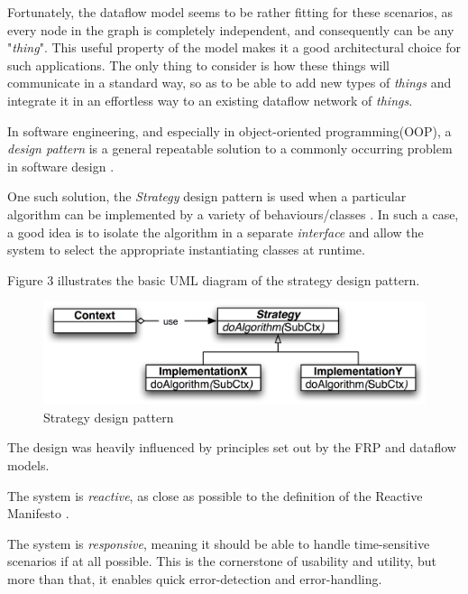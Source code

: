 \documentclass{dithesis}
\begin{document}
Fortunately, the dataflow model seems to be rather fitting for these scenarios, as every node in the graph is completely independent, and consequently can be any "\textit{thing}". This useful property of the model makes it a good architectural choice for such applications. The only thing to consider is how these things will communicate in a standard way, so as to be able to add new types of \textit{things} and integrate it in an effortless way to an existing dataflow network of \textit{things}.


In software engineering, and especially in object-oriented programming(OOP), a \textit{design pattern} is a general repeatable solution to a commonly occurring problem in software design \cite{design}.

One such solution, the \textit{Strategy} design pattern is used when a particular algorithm can be implemented by a variety of behaviours/classes \cite{design}. In such a case, a good idea is to isolate the algorithm in a separate \textit{interface} and allow the system to select the appropriate instantiating classes at runtime.

Figure 3 illustrates the basic UML diagram of the strategy design pattern.

\begin{figure}[h!]
	\centering
	\includegraphics[scale=0.1]{strategy}
  	\caption{Strategy design pattern}
\end{figure}

The design was heavily influenced by principles set out by the FRP and dataflow models. 


The system is \textit{reactive}, as close as possible to the definition of the Reactive Manifesto \cite{manifesto}. 

The system is \textit{responsive}, meaning it should be able to handle time-sensitive scenarios if at all possible. This is the cornerstone of usability and utility, but more than that, it enables quick error-detection and error-handling.
\end{document}
